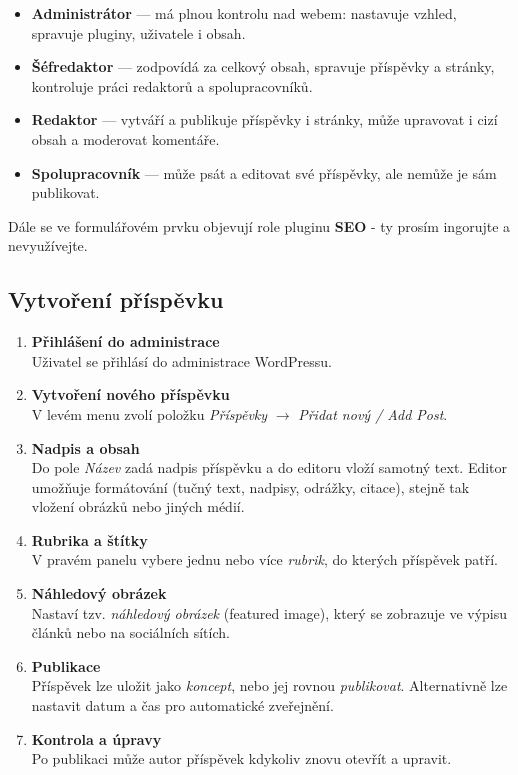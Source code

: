 \documentclass[12pt,a4paper]{article}
\begin{document}
	
	\begin{itemize}
		\item \textbf{Administrátor} — má plnou kontrolu nad webem: nastavuje vzhled, spravuje pluginy, uživatele i obsah.
		\item \textbf{Šéfredaktor} — zodpovídá za celkový obsah, spravuje příspěvky a stránky, kontroluje práci redaktorů a spolupracovníků.
		\item \textbf{Redaktor} — vytváří a publikuje příspěvky i stránky, může upravovat i cizí obsah a moderovat komentáře.
		\item \textbf{Spolupracovník} — může psát a editovat své příspěvky, ale nemůže je sám publikovat.
	\end{itemize}
	
	Dále se ve formulářovém prvku objevují role pluginu \textbf{SEO} - ty prosím ingorujte a nevyužívejte.
	
	
	\subsection{Vytvoření příspěvku}
	
	\begin{enumerate}
		\item \textbf{Přihlášení do administrace} \\
		Uživatel se přihlásí do administrace WordPressu.
		
		\item \textbf{Vytvoření nového příspěvku} \\
		V levém menu zvolí položku \emph{Příspěvky} $\rightarrow$ \emph{Přidat nový / Add Post}.
		
		\item \textbf{Nadpis a obsah} \\
		Do pole \emph{Název} zadá nadpis příspěvku a do editoru vloží samotný text. 
		Editor umožňuje formátování (tučný text, nadpisy, odrážky, citace), 
		stejně tak vložení obrázků nebo jiných médií.
		
		\item \textbf{Rubrika a štítky} \\
		V pravém panelu vybere jednu nebo více \emph{rubrik}, do kterých příspěvek patří. 
		
		\item \textbf{Náhledový obrázek} \\
		Nastaví tzv. \emph{náhledový obrázek} (featured image), 
		který se zobrazuje ve výpisu článků nebo na sociálních sítích.
		
		\item \textbf{Publikace} \\
		Příspěvek lze uložit jako \emph{koncept}, 
		nebo jej rovnou \emph{publikovat}. 
		Alternativně lze nastavit datum a čas pro automatické zveřejnění.
		
		\item \textbf{Kontrola a úpravy} \\
		Po publikaci může autor příspěvek kdykoliv znovu otevřít a upravit.
	\end{enumerate}
	
\end{document}
